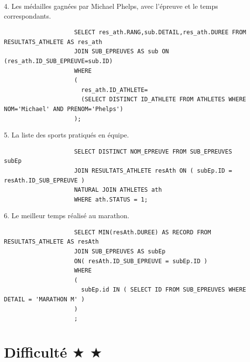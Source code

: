 \documentclass[]{scrreprt}
\begin{document}
			\newpage
			
			{\large 
				4. Les médailles gagnées par Michael Phelps, avec l'épreuve et le temps correspondants.
				
			}
			
			{\footnotesize 
				\begin{tcolorbox}
					\begin{verbatim}
					SELECT res_ath.RANG,sub.DETAIL,res_ath.DUREE FROM RESULTATS_ATHLETE AS res_ath
					JOIN SUB_EPREUVES AS sub ON (res_ath.ID_SUB_EPREUVE=sub.ID)
					WHERE 
					( 
					  res_ath.ID_ATHLETE=
					  (SELECT DISTINCT ID_ATHLETE FROM ATHLETES WHERE NOM='Michael' AND PRENOM='Phelps')
					);
					\end{verbatim}
				\end{tcolorbox}
			}
			
			\vspace{0.5cm}
		
			{\large 
				5. La liste des sports pratiqués en équipe.
				
			}
			
			{\footnotesize 
				\begin{tcolorbox}
					\begin{verbatim}
					SELECT DISTINCT NOM_EPREUVE FROM SUB_EPREUVES subEp
					JOIN RESULTATS_ATHLETE resAth ON ( subEp.ID = resAth.ID_SUB_EPREUVE )
					NATURAL JOIN ATHLETES ath
					WHERE ath.STATUS = 1;
					\end{verbatim}
				\end{tcolorbox}
			}
			
			\vspace{0.5cm}
		
			{\large 
				6. Le meilleur temps réalisé au marathon.
				
			}
			
			{\footnotesize 
				\begin{tcolorbox}
					\begin{verbatim}
					SELECT MIN(resAth.DUREE) AS RECORD FROM  RESULTATS_ATHLETE AS resAth 
					JOIN SUB_EPREUVES AS subEp
					ON( resAth.ID_SUB_EPREUVE = subEp.ID )
					WHERE
					(
					  subEp.id IN ( SELECT ID FROM SUB_EPREUVES WHERE DETAIL = 'MARATHON M' )
					)
					;
					\end{verbatim}
				\end{tcolorbox}
			}
		
		\newpage
			
		\section{Difficulté $\bigstar$ $\bigstar$}
		
\end{document}
